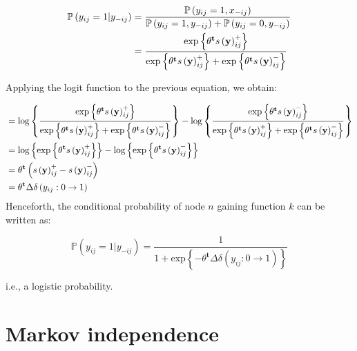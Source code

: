 \documentclass[
]{book}
\begin{document}
\begin{align*}
    {\mathbb{P}\left(y_{ij} = 1|y_{-ij}\right) } & = %
        \frac{{\mathbb{P}\left(y_{ij} = 1, x_{-ij}\right) }}{%
            {\mathbb{P}\left(y_{ij} = 1, y_{-ij}\right) } + {\mathbb{P}\left(y_{ij} = 0, y_{-ij}\right) }} \\
        & = \frac{\mbox{exp}\left\{{\theta}^\mathbf{t}s\left(\mathbf{y}\right)^+_{ij}\right\}}{%
            \mbox{exp}\left\{{\theta}^\mathbf{t}s\left(\mathbf{y}\right)^+_{ij}\right\} + \mbox{exp}\left\{{\theta}^\mathbf{t}s\left(\mathbf{y}\right)^-_{ij}\right\}}
\end{align*}

Applying the logit function to the previous equation, we obtain:

\begin{align*}
& = \mbox{log}\left\{\frac{\mbox{exp}\left\{{\theta}^\mathbf{t}s\left(\mathbf{y}\right)^+_{ij}\right\}}{%
        \mbox{exp}\left\{{\theta}^\mathbf{t}s\left(\mathbf{y}\right)^+_{ij}\right\} + %
        \mbox{exp}\left\{{\theta}^\mathbf{t}s\left(\mathbf{y}\right)^-_{ij}\right\}}\right\} - %
    \mbox{log}\left\{ %
        \frac{\mbox{exp}\left\{{\theta}^\mathbf{t}s\left(\mathbf{y}\right)^-_{ij}\right\}}{%
            \mbox{exp}\left\{{\theta}^\mathbf{t}s\left(\mathbf{y}\right)^+_{ij}\right\} + \mbox{exp}\left\{{\theta}^\mathbf{t}s\left(\mathbf{y}\right)^-_{ij}\right\}}%
     \right\} \\
 & = \mbox{log}\left\{\mbox{exp}\left\{{\theta}^\mathbf{t}s\left(\mathbf{y}\right)^+_{ij}\right\}\right\} - \mbox{log}\left\{\mbox{exp}\left\{{\theta}^\mathbf{t}s\left(\mathbf{y}\right)^-_{ij}\right\}\right\} \\
 & = {\theta}^\mathbf{t}\left(s\left(\mathbf{y}\right)^+_{ij} - s\left(\mathbf{y}\right)^-_{ij}\right) \\
 & = {\theta}^\mathbf{t}\Delta\delta\left(y_{ij}:0\to 1\right)
\end{align*}
\noindent Henceforth, the conditional probability of node \(n\) gaining function \(k\) can be written as:

\begin{equation}
    {\mathbb{P}\left(y_{ij} = 1|y_{-ij}\right) } = \frac{1}{1 + \mbox{exp}\left\{-{\theta}^\mathbf{t}\Delta\delta\left(y_{ij}:0\to 1\right)\right\}}
\end{equation}

\noindent i.e., a logistic probability.

\hypertarget{markov-independence}{%
\section{Markov independence}\label{markov-independence}}
\end{document}
